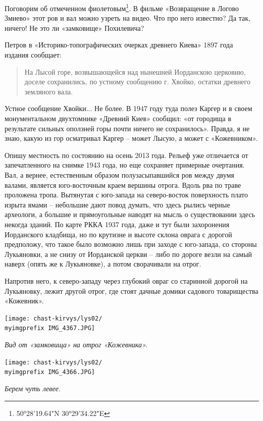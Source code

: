Поговорим об отмеченном фиолетовым\footnote{50°28'19.64"N 30°29'34.22"E}. В фильме «Возвращение в Логово Змиево» этот ров и вал можно узреть на видео. Что про него известно? Да так, ничего! Не это ли «замковище» Похилевича?

Петров в «Историко-топографических очерках древнего Киева» 1897 года издания сообщает:

\begin{quotation}
На Лысой горе, возвышающейся над нынешней Иорданскою церковию, доселе сохранились, по устному сообщению г. Хвойко, остатки древнего земляного вала.
\end{quotation}

Устное сообщение Хвойки... Не более. В 1947 году туда полез Каргер и в своем монументальном двухтомнике «Древний Киев» сообщил: «от городища в результате сильных оползней горы почти ничего не сохранилось». Правда, я не знаю, какую из гор осматривал Каргер – может Лысую, а может с «Кожевником».

Опишу местность по состоянию на осень 2013 года. Рельеф уже отличается от запечатленного на снимке 1943 года, но еще сохраняет примерные очертания. Вал, а вернее, естественным образом полузасыпавшийся ров между двумя валами, является юго-восточным краем вершины отрога. Вдоль рва по траве проложена тропа. Вытянутая с юго-запада на северо-восток поверхность плато изрыта ямами – небольшие дают повод думать, что здесь рылись черные археологи, а большие и прямоугольные наводят на мысль о существовании здесь некогда зданий. По карте РККА 1937 года, даже и тут были захоронения Иорданского кладбища, но по крутизне и высоте склона оврага с дорогой предположу, что такое было возможно лишь при заходе с юго-запада, со стороны Лукьяновки, а не снизу от Иорданской церкви – либо по дороге везли на самый наверх (опять же к Лукьяновке), а потом сворачивали на отрог.

Напротив него, к северо-западу через глубокий овраг со старинной дорогой на Лукьяновку, лежит другой отрог, где стоят дачные домики садового товарищества «Кожевник». 

\begin{center}
\texttt{[image: chast-kirvys/lys02/\\myimgprefix IMG\_4367.JPG]}

\textit{Вид от «замковища» на отрог «Кожевника».}
\end{center}

\begin{center}
\texttt{[image: chast-kirvys/lys02/\\myimgprefix  IMG\_4366.JPG]}

\textit{Берем чуть левее.}
\end{center}

